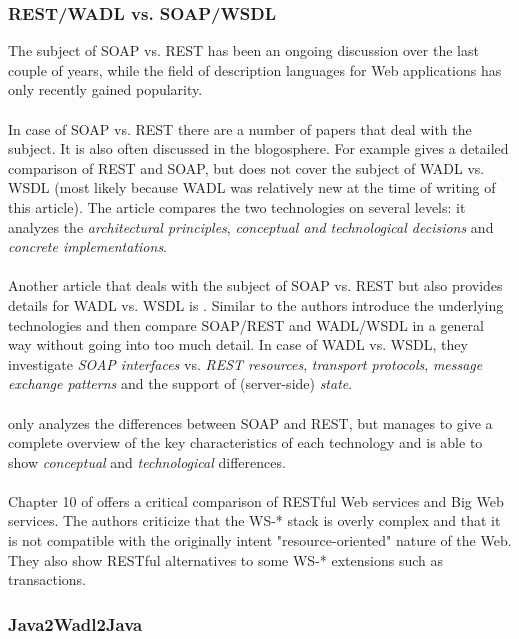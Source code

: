 \subsubsection*{REST/WADL vs. SOAP/WSDL}
The subject of SOAP vs. REST has been an ongoing discussion over the last couple of years, while the field of description languages for Web applications has only recently gained popularity.
\\ \\
In case of SOAP vs. REST there are a number of papers that deal with the subject. It is also often discussed in the blogosphere. For example \cite{BIGREST} gives a detailed comparison of REST and SOAP, but does not cover the subject of WADL vs. WSDL (most likely because WADL was relatively new at the time of writing of this article). The article compares the two technologies on several levels: it analyzes the \emph{architectural principles}, \emph{conceptual and technological decisions} and \emph{concrete implementations}.
\\ \\
Another article that deals with the subject of SOAP vs. REST but also provides details for WADL vs. WSDL is \cite{WADLWSDL}. Similar to \cite{BIGREST} the authors introduce the underlying technologies and then compare SOAP/REST and WADL/WSDL in a general way without going into too much detail. In case of WADL vs. WSDL, they investigate \emph{SOAP interfaces} vs. \emph{REST resources}, \emph{transport protocols}, \emph{message exchange patterns} and the support of (server-side) \emph{state}.
\\ \\
\cite{BRINGBACKWEB} only analyzes the differences between SOAP and REST, but manages to give a complete overview of the key characteristics of each technology and is able to show \emph{conceptual} and \emph{technological} differences.
\\ \\
Chapter 10 of \cite{RESTFULWEB} offers a critical comparison of RESTful Web services and Big Web services. The authors criticize that the WS-* stack is overly complex and that it is not compatible with the originally intent "resource-oriented" nature of the Web. They also show RESTful alternatives to some WS-* extensions such as transactions.

\subsubsection*{Java2Wadl2Java}

